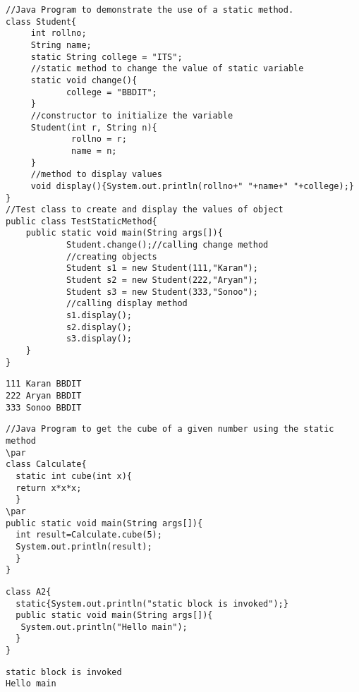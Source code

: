 \documentclass{book}
\def\lthtmlcheckvsize{\ifdim\ht\sizebox<\vsize 
  \ifdim\wd\sizebox<\hsize\expandafter\hfill\fi \expandafter\vfill
  \else\expandafter\vss\fi}%
\begin{document}
{\newpage\clearpage
{}%
\begin{lstlisting}
//Java Program to demonstrate the use of a static method.  
class Student{  
     int rollno;  
     String name;  
     static String college = "ITS";  
     //static method to change the value of static variable  
     static void change(){  
			college = "BBDIT";  
     }  
     //constructor to initialize the variable  
     Student(int r, String n){  
			 rollno = r;  
			 name = n;  
     }  
     //method to display values  
     void display(){System.out.println(rollno+" "+name+" "+college);}  
}  
//Test class to create and display the values of object  
public class TestStaticMethod{  
    public static void main(String args[]){  
			Student.change();//calling change method  
			//creating objects  
			Student s1 = new Student(111,"Karan");  
			Student s2 = new Student(222,"Aryan");  
			Student s3 = new Student(333,"Sonoo");  
			//calling display method  
			s1.display();  
			s2.display();  
			s3.display();  
    }  
}
\end{lstlisting}%
\lthtmlfigureZ
\lthtmlcheckvsize\clearpage}

{\newpage\clearpage
{}%
\begin{lstlisting}
111 Karan BBDIT
222 Aryan BBDIT
333 Sonoo BBDIT
\end{lstlisting}%
\lthtmlfigureZ
\lthtmlcheckvsize\clearpage}

{\newpage\clearpage
{}%
\begin{lstlisting}
//Java Program to get the cube of a given number using the static method  
\par
class Calculate{  
  static int cube(int x){  
  return x*x*x;  
  }  
\par
public static void main(String args[]){  
  int result=Calculate.cube(5);  
  System.out.println(result);  
  }  
}  
\end{lstlisting}%
\lthtmlfigureZ
\lthtmlcheckvsize\clearpage}

{\newpage\clearpage
{}%
\begin{lstlisting}
class A2{  
  static{System.out.println("static block is invoked");}  
  public static void main(String args[]){  
   System.out.println("Hello main");  
  }  
}  
\end{lstlisting}%
\lthtmlfigureZ
\lthtmlcheckvsize\clearpage}

{\newpage\clearpage
{}%
\begin{lstlisting}
static block is invoked
Hello main
\end{lstlisting}%
\lthtmlfigureZ
\lthtmlcheckvsize\clearpage}
\end{document}
